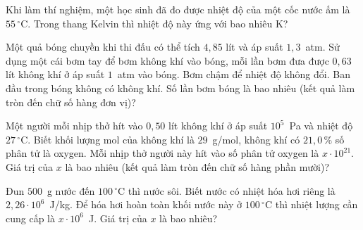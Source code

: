 	\begin{ex}%
		Khi làm thí nghiệm, một học sinh đã đo được nhiệt độ của một cốc nước ấm là $55\,^\circ\text{C}$. Trong thang Kelvin thì nhiệt độ này ứng với bao nhiêu K?
		\par
	\end{ex}

	\begin{ex}%
		Một quả bóng chuyền khi thi đấu có thể tích $4{,}85$ lít và áp suất $1{,}3$~atm. Sử dụng một cái bơm tay để bơm không khí vào bóng, mỗi lần bơm đưa được $0{,}63$ lít không khí ở áp suất $1$~atm vào bóng. Bơm chậm để nhiệt độ không đổi. Ban đầu trong bóng không có không khí. Số lần bơm bóng là bao nhiêu (kết quả làm tròn đến chữ số hàng đơn vị)?
		\par
	\end{ex}

	\begin{ex}%
		Một người mỗi nhịp thở hít vào $0{,}50$ lít không khí ở áp suất $10^5$~Pa và nhiệt độ $27\,^\circ\text{C}$. Biết khối lượng mol của không khí là $29$~g/mol, không khí có $21{,}0\,\%$ số phân tử là oxygen. Mỗi nhịp thở người này hít vào số phân tử oxygen là $x\cdot 10^{21}$. Giá trị của $x$ là bao nhiêu (kết quả làm tròn đến chữ số hàng phần mười)?
		\par
	\end{ex}

	\begin{ex}%
		Đun $500$~g nước đến $100\,^\circ\text{C}$ thì nước sôi. Biết nước có nhiệt hóa hơi riêng là $2{,}26\cdot 10^6$~J/kg. Để hóa hơi hoàn toàn khối nước này ở $100\,^\circ\text{C}$ thì nhiệt lượng cần cung cấp là $x\cdot 10^6$~J. Giá trị của $x$ là bao nhiêu?
		\par
	\end{ex}

